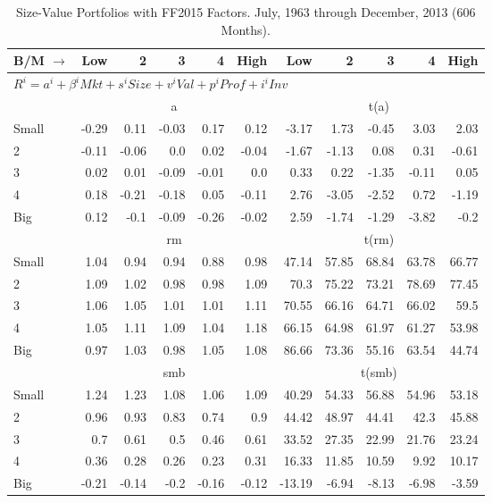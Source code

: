 
\begin{table}[!ht]
\centering
\caption{Size-Value Portfolios with FF2015 Factors. \footnotesize{July, 1963 through December, 2013 (606 Months).}}
\begin{tabular}{lrrrrrrrrrr}
  \toprule
  B/M $\rightarrow$ & Low & 2 & 3 & 4 & High & Low & 2 & 3 & 4 & High \\ 
  \toprule
  \multicolumn{9}{l}{$R^i=a^i+\beta^iMkt+s^iSize+v^iVal+p^iProf+i^iInv$} \\

  

      & \multicolumn{5}{c}{a} & \multicolumn{5}{c}{t(a)} \\
    \cmidrule(r){2-6} \cmidrule(r){7-11}
      Small  & -0.29  & 0.11  & -0.03  & 0.17  & 0.12   & -3.17  & 1.73  & -0.45  & 3.03  & 2.03  \\
          2  & -0.11  & -0.06  & 0.0  & 0.02  & -0.04   & -1.67  & -1.13  & 0.08  & 0.31  & -0.61  \\
          3  & 0.02  & 0.01  & -0.09  & -0.01  & 0.0   & 0.33  & 0.22  & -1.35  & -0.11  & 0.05  \\
          4  & 0.18  & -0.21  & -0.18  & 0.05  & -0.11   & 2.76  & -3.05  & -2.52  & 0.72  & -1.19  \\
      Big    & 0.12  & -0.1  & -0.09  & -0.26  & -0.02   & 2.59  & -1.74  & -1.29  & -3.82  & -0.2  \\

  

      & \multicolumn{5}{c}{rm} & \multicolumn{5}{c}{t(rm)} \\
    \cmidrule(r){2-6} \cmidrule(r){7-11}
      Small  & 1.04  & 0.94  & 0.94  & 0.88  & 0.98   & 47.14  & 57.85  & 68.84  & 63.78  & 66.77  \\
          2  & 1.09  & 1.02  & 0.98  & 0.98  & 1.09   & 70.3  & 75.22  & 73.21  & 78.69  & 77.45  \\
          3  & 1.06  & 1.05  & 1.01  & 1.01  & 1.11   & 70.55  & 66.16  & 64.71  & 66.02  & 59.5  \\
          4  & 1.05  & 1.11  & 1.09  & 1.04  & 1.18   & 66.15  & 64.98  & 61.97  & 61.27  & 53.98  \\
      Big    & 0.97  & 1.03  & 0.98  & 1.05  & 1.08   & 86.66  & 73.36  & 55.16  & 63.54  & 44.74  \\

  

      & \multicolumn{5}{c}{smb} & \multicolumn{5}{c}{t(smb)} \\
    \cmidrule(r){2-6} \cmidrule(r){7-11}
      Small  & 1.24  & 1.23  & 1.08  & 1.06  & 1.09   & 40.29  & 54.33  & 56.88  & 54.96  & 53.18  \\
          2  & 0.96  & 0.93  & 0.83  & 0.74  & 0.9   & 44.42  & 48.97  & 44.41  & 42.3  & 45.88  \\
          3  & 0.7  & 0.61  & 0.5  & 0.46  & 0.61   & 33.52  & 27.35  & 22.99  & 21.76  & 23.24  \\
          4  & 0.36  & 0.28  & 0.26  & 0.23  & 0.31   & 16.33  & 11.85  & 10.59  & 9.92  & 10.17  \\
      Big    & -0.21  & -0.14  & -0.2  & -0.16  & -0.12   & -13.19  & -6.94  & -8.13  & -6.98  & -3.59  \\


\end{tabular}
\end{table}
